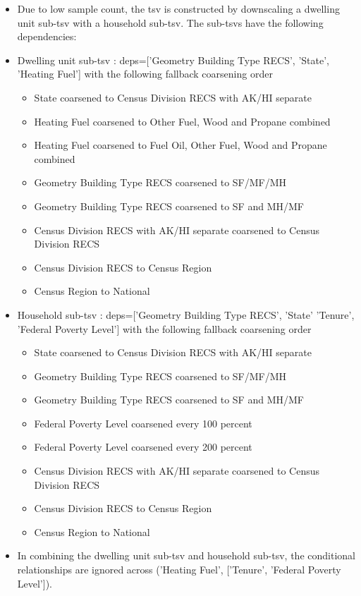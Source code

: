 \begin{itemize}
\item Due to low sample count, the tsv is constructed by downscaling a dwelling unit sub-tsv with a household sub-tsv. The sub-tsvs have the following dependencies:
\item Dwelling unit sub-tsv : deps=['Geometry Building Type RECS', 'State', 'Heating Fuel'] with the following fallback coarsening order
  \begin{itemize}
  \item State coarsened to Census Division RECS with AK/HI separate
  \item Heating Fuel coarsened to Other Fuel, Wood and Propane combined
  \item Heating Fuel coarsened to Fuel Oil, Other Fuel, Wood and Propane combined
  \item Geometry Building Type RECS coarsened to SF/MF/MH
  \item Geometry Building Type RECS coarsened to SF and MH/MF
  \item Census Division RECS with AK/HI separate coarsened to Census Division RECS
  \item Census Division RECS to Census Region
  \item Census Region to National
  \end{itemize}
\item Household sub-tsv : deps=['Geometry Building Type RECS', 'State' 'Tenure', 'Federal Poverty Level'] with the following fallback coarsening order
  \begin{itemize}
  \item State coarsened to Census Division RECS with AK/HI separate
  \item Geometry Building Type RECS coarsened to SF/MF/MH
  \item Geometry Building Type RECS coarsened to SF and MH/MF
  \item Federal Poverty Level coarsened every 100 percent
  \item Federal Poverty Level coarsened every 200 percent
  \item Census Division RECS with AK/HI separate coarsened to Census Division RECS
  \item Census Division RECS to Census Region
  \item Census Region to National
  \end{itemize}
\item In combining the dwelling unit sub-tsv and household sub-tsv, the conditional relationships are ignored across ('Heating Fuel', ['Tenure', 'Federal Poverty Level']).
\end{itemize}
